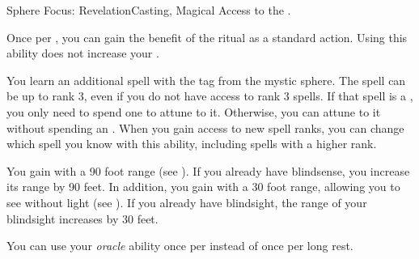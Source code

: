     \begin{magicalfeat}{Sphere Focus: Revelation}{Casting, Magical}
        \featpre Access to the  .

         Once per , you can gain the benefit of the  ritual as a standard action.
        Using this ability does not increase your .

         You learn an additional spell with the  tag from the  mystic sphere.
        The spell can be up to rank 3, even if you do not have access to rank 3 spells.
        If that spell is a , you only need to spend one  to attune to it.
        Otherwise, you can attune to it without spending an .
        When you gain access to new spell ranks, you can change which spell you know with this ability, including spells with a higher rank.

         You gain  with a 90 foot range (see ).
        If you already have blindsense, you increase its range by 90 feet.
        In addition, you gain  with a 30 foot range, allowing you to see without light (see ).
        If you already have blindsight, the range of your blindsight increases by 30 feet.

         You can use your \textit{oracle} ability once per  instead of once per long rest.
    \end{magicalfeat}

